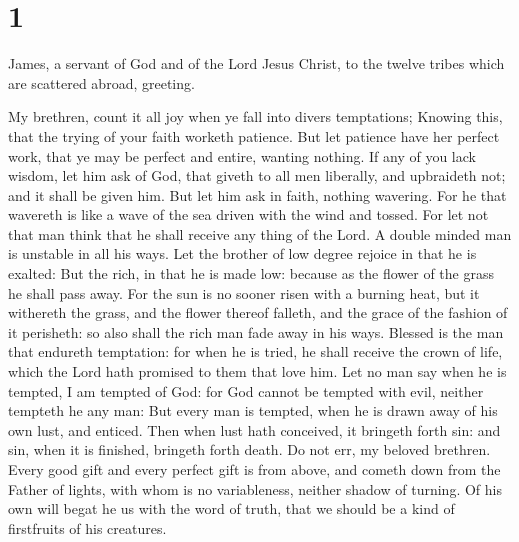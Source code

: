 \hypertarget{section}{%
\section{1}\label{section}}

 James, a servant of God and of the Lord Jesus Christ, to
the twelve tribes which are scattered abroad, greeting.

 My brethren, count it all joy when ye fall into divers
temptations;  Knowing this, that the trying of your faith
worketh patience.  But let patience have her perfect work,
that ye may be perfect and entire, wanting nothing.  If any
of you lack wisdom, let him ask of God, that giveth to all men
liberally, and upbraideth not; and it shall be given him. 
But let him ask in faith, nothing wavering. For he that wavereth is like
a wave of the sea driven with the wind and tossed.  For let
not that man think that he shall receive any thing of the Lord.
 A double minded man is unstable in all his ways.
 Let the brother of low degree rejoice in that he is
exalted:  But the rich, in that he is made low: because as
the flower of the grass he shall pass away.  For the sun is
no sooner risen with a burning heat, but it withereth the grass, and the
flower thereof falleth, and the grace of the fashion of it perisheth: so
also shall the rich man fade away in his ways.  Blessed is
the man that endureth temptation: for when he is tried, he shall receive
the crown of life, which the Lord hath promised to them that love him.
 Let no man say when he is tempted, I am tempted of God:
for God cannot be tempted with evil, neither tempteth he any man:
 But every man is tempted, when he is drawn away of his own
lust, and enticed.  Then when lust hath conceived, it
bringeth forth sin: and sin, when it is finished, bringeth forth death.
 Do not err, my beloved brethren.  Every good
gift and every perfect gift is from above, and cometh down from the
Father of lights, with whom is no variableness, neither shadow of
turning.  Of his own will begat he us with the word of
truth, that we should be a kind of firstfruits of his creatures.

